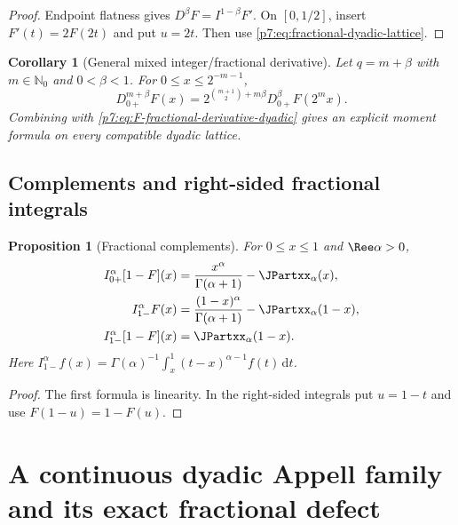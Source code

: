 \documentclass[11pt,oneside]{article}
\newtheorem{proposition}[theorem]{Proposition}
\newtheorem{corollary}[theorem]{Corollary}
\theoremstyle{definition}
\theoremstyle{remark}
\newcommand{\N}{\mathbb N}
\newcommand{\dd}{\,\mathrm d}
\newcommand{\1}{\mathbf 1}
\begin{document}
\begin{proof}
Endpoint flatness gives $D^\beta F=I^{1-\beta}F'$.  On $[0,1/2]$, insert
$F'(t)=2F(2t)$ and put $u=2t$.  Then use \cref{p7:eq:fractional-dyadic-lattice}.
\end{proof}

\begin{corollary}[General mixed integer/fractional derivative]
\label{p7:cor:mixed-fractional-derivative}
Let $q=m+\beta$ with $m\in\N_0$ and $0<\beta<1$.  For
$0\le x\le2^{-m-1}$,
\begin{equation}
 D_{0+}^{m+\beta}F(x)
 =2^{\binom{m+1}{2}+m\beta}
 D_{0+}^{\beta}F(2^mx).
 \label{p7:eq:mixed-fractional-derivative}
\end{equation}
Combining with \cref{p7:eq:F-fractional-derivative-dyadic} gives an explicit moment formula on
every compatible dyadic lattice.
\end{corollary}

\subsection{Complements and right-sided fractional integrals}

\begin{proposition}[Fractional complements]
\label{p7:prop:fractional-complements}
For $0\le x\le1$ and $\Ree\alpha>0$,
\begin{align}
 I_{0+}^{\alpha}[1-F](x)
 &=\frac{x^\alpha}{\Gamma(\alpha+1)}-\JPartxx_\alpha(x),
 \label{p7:eq:fractional-complement-left}\\
 I_{1-}^{\alpha}F(x)
 &=\frac{(1-x)^\alpha}{\Gamma(\alpha+1)}-\JPartxx_\alpha(1-x),
 \label{p7:eq:fractional-right-F}\\
 I_{1-}^{\alpha}[1-F](x)
 &=\JPartxx_\alpha(1-x).
 \label{p7:eq:fractional-right-complement}
\end{align}
Here
$I_{1-}^{\alpha}f(x)=\Gamma(\alpha)^{-1}\int_x^1(t-x)^{\alpha-1}f(t)\dd t$.
\end{proposition}

\begin{proof}
The first formula is linearity.  In the right-sided integrals put $u=1-t$ and use
$F(1-u)=1-F(u)$.
\end{proof}

\section{A continuous dyadic Appell family and its exact fractional defect}
\label{p7:sec:Appell}
\end{document}
